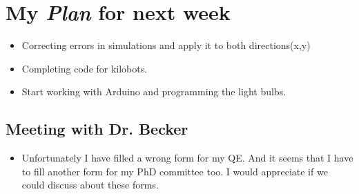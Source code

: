 \section{My \emph{Plan} for next week}

\begin{itemize}
\item Correcting errors in simulations and apply it to both directions(x,y)
\item Completing code for kilobots.
\item Start working with Arduino and programming the light bulbs.

\end{itemize}

\subsection{Meeting with Dr. Becker  }

\begin{itemize}
\item Unfortunately I have filled a wrong form for my QE. And it seems that I have to fill another form for my PhD committee too. I would appreciate if we could discuss about these forms.
\end{itemize}


